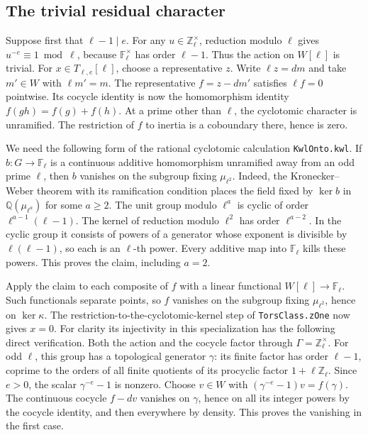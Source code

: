 \subsection{The trivial residual character}

Suppose first that \(\ell-1\mid e\). For any
\(u\in\mathbb Z_\ell^\times\), reduction modulo \(\ell\) gives
\(u^{-e}\equiv1\bmod\ell\), because
\(\mathbb F_\ell^\times\) has order \(\ell-1\). Thus the action on
\(W[\ell]\) is trivial. For \(x\in T_{\ell,e}[\ell]\), choose a
representative \(z\). Write \(\ell z=dm\) and take \(m'\in W\)
with \(\ell m'=m\). The representative \(f=z-dm'\) satisfies
\(\ell f=0\) pointwise. Its cocycle identity is now the homomorphism
identity \(f(gh)=f(g)+f(h)\). At a prime other than \(\ell\),
the cyclotomic character is unramified. The restriction of \(f\)
to inertia is a coboundary there, hence is zero.

We need the following form of the rational cyclotomic calculation
\texttt{Kwl\allowbreak{}Onto.\allowbreak{}kwl}. If \(b:G\to\mathbb F_\ell\) is a continuous
additive homomorphism unramified away from an odd prime \(\ell\), then
\(b\) vanishes on the subgroup fixing \(\mu_{\ell^2}\).
Indeed, the Kronecker--Weber theorem with its ramification condition
places the field fixed by \(\ker b\) in \(\mathbb Q(\mu_{\ell^a})\)
for some \(a\ge2\). The unit group modulo \(\ell^a\) is cyclic of
order \(\ell^{a-1}(\ell-1)\). The kernel of reduction modulo
\(\ell^2\) has order \(\ell^{a-2}\). In the cyclic group it consists
of powers of a generator whose exponent is divisible by
\(\ell(\ell-1)\), so each is an \(\ell\)-th power. Every additive
map into \(\mathbb F_\ell\) kills these powers. This proves the claim,
including \(a=2\).

Apply the claim to each composite of \(f\) with a linear functional
\(W[\ell]\to\mathbb F_\ell\). Such functionals separate points, so
\(f\) vanishes on the subgroup fixing \(\mu_{\ell^2}\), hence on
\(\ker\kappa\). The restriction-to-the-cyclotomic-kernel step of
\texttt{Tors\allowbreak{}Class.\allowbreak{}z\allowbreak{}One} now gives \(x=0\). For clarity its injectivity
in this specialization has the following direct verification. Both the
action and the cocycle factor through \(\Gamma=\mathbb Z_\ell^\times\).
For odd \(\ell\), this group has a topological generator \(\gamma\):
its finite factor has order \(\ell-1\), coprime to the orders of all
finite quotients of its procyclic factor \(1+\ell\mathbb Z_\ell\).
Since \(e>0\), the scalar \(\gamma^{-e}-1\) is nonzero.
Choose \(v\in W\) with \((\gamma^{-e}-1)v=f(\gamma)\).
The continuous cocycle \(f-dv\) vanishes on \(\gamma\), hence on all
its integer powers by the cocycle identity, and then everywhere by
density. This proves the vanishing in the first case.

